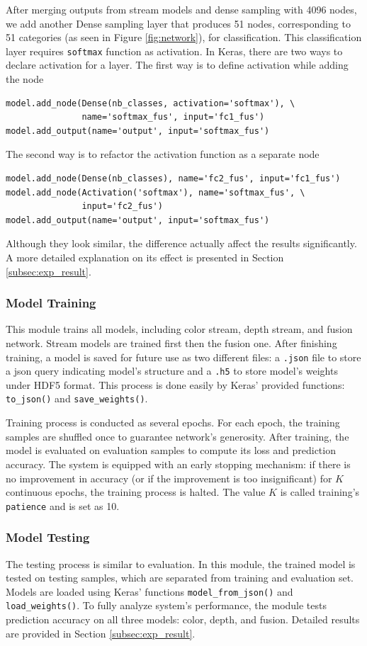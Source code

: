 After merging outputs from stream models and dense sampling with 4096 nodes, we add another Dense sampling layer that produces 51 nodes, corresponding to 51 categories (as seen in Figure \ref{fig:network}), for classification. This classification layer requires \texttt{softmax} function as activation. In Keras, there are two ways to declare activation for a layer. The first way is to define activation while adding the node
\begin{verbatim}
model.add_node(Dense(nb_classes, activation='softmax'), \
               name='softmax_fus', input='fc1_fus')
model.add_output(name='output', input='softmax_fus')
\end{verbatim}
The second way is to refactor the activation function as a separate node
\begin{verbatim}
model.add_node(Dense(nb_classes), name='fc2_fus', input='fc1_fus')
model.add_node(Activation('softmax'), name='softmax_fus', \
               input='fc2_fus')
model.add_output(name='output', input='softmax_fus')
\end{verbatim}
Although they look similar, the difference actually affect the results significantly. A more detailed explanation on its effect is presented in Section \ref{subsec:exp_result}.

\subsubsection{Model Training}
This module trains all models, including color stream, depth stream, and fusion network. Stream models are trained first then the fusion one. After finishing training, a model is saved for future use as two different files: a \texttt{.json} file to store a json query indicating model's structure and a \texttt{.h5} to store model's weights under HDF5 format. This process is done easily by Keras' provided functions: \texttt{to\_json()} and \texttt{save\_weights()}.

Training process is conducted as several epochs. For each epoch, the training samples are shuffled once to guarantee network's generosity. After training, the model is evaluated on evaluation samples to compute its loss and prediction accuracy. The system is equipped with an early stopping mechanism: if there is no improvement in accuracy (or if the improvement is too insignificant) for $K$ continuous epochs, the training process is halted. The value $K$ is called training's \texttt{patience} and is set as 10.

\subsubsection{Model Testing}
The testing process is similar to evaluation. In this module, the trained model is tested on testing samples, which are separated from training and evaluation set. Models are loaded using Keras' functions \texttt{model\_from\_json()} and \texttt{load\_weights()}. To fully analyze system's performance, the module tests prediction accuracy on all three models: color, depth, and fusion. Detailed results are provided in Section \ref{subsec:exp_result}.


